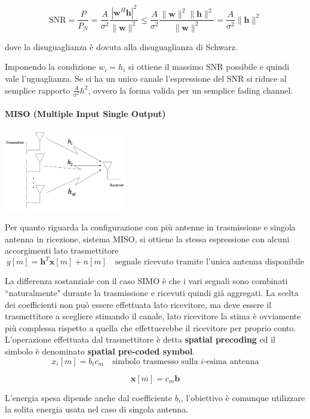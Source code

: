 \[
    \text{SNR} = \frac{P}{P_N} = \frac{A}{\sigma^2} \frac{\left| \mathbf{w}^H \mathbf{h} \right|^2}{\|\mathbf{w}\|^2} \leq \frac{A}{\sigma^2} \frac{\|\mathbf{w}\|^2 \|\mathbf{h}\|^2}{\|\mathbf{w}\|^2} = \frac{A}{\sigma^2} \|\mathbf{h}\|^2 
\]



dove la disuguaglianza è dovuta alla disuguaglianza di Schwarz. 

Imponendo la condizione $w_i = h_i$ si ottiene il massimo SNR possibile e quindi vale l'uguaglianza.
Se si ha un unico canale l'espressione del SNR si riduce al semplice rapporto $\frac{A}{\sigma^2}h^2$, ovvero la forma valida per un semplice fading channel.
\paragraph*{MISO (Multiple Input Single Output)}
\begin{center}
    \includegraphics[width=0.4\textwidth]{imgs/miso.jpg}
\end{center}
Per quanto riguarda la configurazione con più antenne in trasmissione e singola antenna in ricezione, sistema MISO, si ottiene la stessa espressione con alcuni accorgimenti lato trasmettitore
\[
    y[m] = \mathbf{h}^T \mathbf{x}[m] + n[m] \quad \text{segnale ricevuto tramite l'unica antenna disponibile}
\]

La differenza sostanziale con il caso SIMO è che i vari segnali sono combinati ``naturalmente" durante la trasmissione e ricevuti quindi già aggregati. 
La scelta dei coefficienti non può essere effettuata lato ricevitore, ma deve essere il trasmettitore a scegliere stimando il canale, lato ricevitore la stima è ovviamente più complessa rispetto a quella che effettuerebbe il ricevitore per proprio conto.
L'operazione effettuata dal trasmettitore è detta \textbf{spatial precoding} ed il simbolo è denominato \textbf{spatial pre-coded symbol}.
\[
    x_i[m] = b_i c_m \quad \text{simbolo trasmesso sulla $i$-esima antenna}
\]

\[
    \mathbf{x}[m] = c_m \mathbf{b} 
\]

L'energia spesa dipende anche dal coefficiente $b_i$, l'obiettivo è comunque utilizzare la solita energia usata nel caso di singola antenna.

